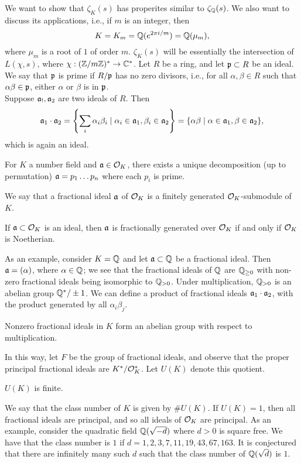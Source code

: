 \noindent We want to show that $\zeta_K(s)$ has properites similar to $\zeta_\mathbb Q(s)$. We also want to discuss its applications, i.e., if $m$ is an integer, then
\[ K = K_m = \mathbb Q(e^{2\pi i/m}) = \mathbb Q(\mu_m), \]
where $\mu_m$ is a root of $1$ of order $m$. $\zeta_K(s)$ will be essentially the intersection of $L(\chi, s)$, where $\chi : (\mathbb Z/m\mathbb Z)^\ast \to \mathbb C^\ast$. Let $R$ be a ring, and let $\mathfrak p \subset R$ be an ideal. We say that $\mathfrak p$ is prime if $R/\mathfrak p$ has no zero divisors, i.e., for all $\alpha, \beta \in R$ such that $\alpha \beta \in \mathfrak p$, either $\alpha$ or $\beta$ is in $\mathfrak p$.
\\[8pt]
Suppose $\mathfrak a_!, \mathfrak a_2$ are two ideals of $R$. Then
\[ \mathfrak a_1 \cdot \mathfrak a_2 = \left\{\sum_i \alpha_i \beta_i \mid \alpha_i \in \mathfrak a_1, \beta_i \in \mathfrak a_2\right\} = \{\alpha \beta \mid \alpha \in \mathfrak a_1, \beta \in \mathfrak a_2\}, \]
which is again an ideal.
\begin{theorem}
    For $K$ a number field and $\mathfrak a \in \mathcal O_K$, there exists a unique decomposition (up to permutation) $\mathfrak a = p_1 \dots p_n$ where each $p_i$ is prime.
\end{theorem}
\noindent We say that a fractional ideal $\mathfrak a$ of $\mathcal O_K$ is a finitely generated $\mathcal O_K$-submodule of $K$.
\begin{lemma}
    If $\mathfrak a \subset \mathcal O_K$ is an ideal, then $\mathfrak a$ is fractionally generated over $\mathcal O_K$ if and only if $\mathcal O_K$ is Noetherian.
\end{lemma}
\noindent As an example, consider $K = \mathbb Q$ and let $\mathfrak a \subset \mathbb Q$ be a fractional ideal. Then $\mathfrak a = (\alpha)$, where $\alpha \in \mathbb Q$; we see that the fractional ideals of $\mathbb Q$ are $\mathbb Q_{\geq 0}$ with non-zero fractional ideals being isomorphic to $\mathbb Q_{>0}$. Under multiplication, $\mathbb Q_{>0}$ is an abelian group $\mathbb Q^\ast / \pm 1$. We can define a product of fractional ideals $\mathfrak a_1 \cdot \mathfrak a_2$, with the product generated by all $\alpha_i \beta_j$.
\begin{theorem}
    Nonzero fractional ideals in $K$ form an abelian group with respect to multiplication.
\end{theorem}
\noindent In this way, let $F$ be the group of fractional ideals, and observe that the proper principal fractional ideals are $K^\ast / \mathcal O_K^\ast$. Let $U(K)$ denote this quotient.
\begin{theorem}
    $U(K)$ is finite.
\end{theorem}
\noindent We say that the class number of $K$ is given by $\# U(K)$. If $U(K)  = 1$, then all fractional ideals are principal, and so all ideals of $\mathcal O_K$ are principal. As an example, consider the quadratic field $\mathbb Q(\sqrt{-d})$ where $d > 0$ is square free. We have that the class number is $1$ if $d = 1, 2, 3, 7, 11, 19, 43, 67, 163$. It is conjectured that there are infinitely many such $d$ such that the class number of $\mathbb Q(\sqrt{d})$ is $1$.
